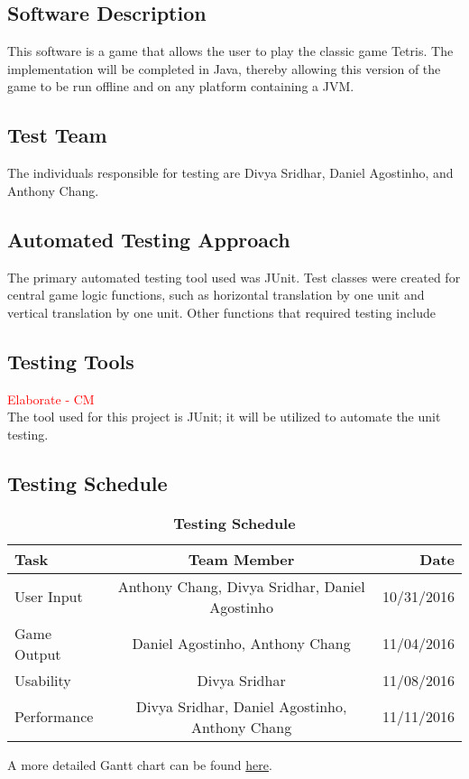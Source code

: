 \documentclass[12pt, titlepage]{article}
\begin{document}
\subsection{Software Description}
This software is a game that allows the user to play the classic game Tetris. The implementation will be completed in Java, thereby allowing this version of the game to be run offline and on any platform containing a JVM.
\subsection{Test Team}
The individuals responsible for testing are Divya Sridhar, Daniel Agostinho, and Anthony Chang.
\subsection{Automated Testing Approach}
The primary automated testing tool used was JUnit. Test classes were created for central game logic functions, such as horizontal translation by one unit and vertical translation by one unit. Other functions that required testing include 
\subsection{Testing Tools}
\textcolor{red}{Elaborate - CM} \\
The tool used for this project is JUnit; it will be utilized to automate the unit testing.
\subsection{Testing Schedule}
\begin{table}[!htbp]
\centering
\caption{\bf Testing Schedule}
\label{Table}	

\begin{tabular}[pos]{|l|c|r|}
\hline
\color{red}\textbf{Task}& \color{red}\textbf{Team Member} & \color{red}\textbf{Date} \\ \hline
User Input & Anthony Chang, Divya Sridhar, Daniel Agostinho & 10/31/2016\\ \hline
Game Output &  Daniel Agostinho, Anthony Chang & 11/04/2016\\ \hline
Usability & Divya Sridhar & 11/08/2016\\ \hline
Performance & Divya Sridhar, Daniel Agostinho, Anthony Chang & 11/11/2016\\ \hline 
		
\end{tabular}
\end{table}		
A more detailed Gantt chart can be found \href{run:./Team11_gantt.gan}{here}.
\end{document}
